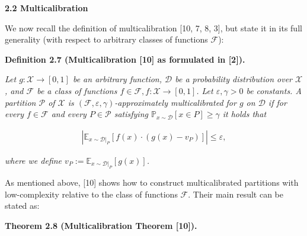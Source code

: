 \par\medskip\noindent\textbf{
2.2 Multicalibration}\par




We now recall the definition of multicalibration [10, 7, 8, 3], but state it in its full generality (with respect to arbitrary classes of functions $\mathcal{F}$):\par





\par\medskip\noindent\textbf{
\textbf{Definition 2.7}\textbf{ }(Multicalibration [10] as formulated in [2])\textbf{.}
}\par



\emph{Let $g:\mathcal{X}\rightarrow[0,1]$ be an arbitrary function, $\mathcal{D}$ be a probability distribution over $\mathcal{X}$, and $\mathcal{F}$ be a class of functions $f\in\mathcal{F},f:\mathcal{X}\rightarrow[0,1]$. Let $\varepsilon,\gamma>0$ be constants. A partition $\mathcal{P}$ of $\mathcal{X}$ is $(\mathcal{F},\varepsilon,\gamma)$-approximately multicalibrated for $g$ on $\mathcal{D}$ if for every $f\in\mathcal{F}$ and every $P\in\mathcal{P}$ satisfying $\mathbb{P}_{x\sim\mathcal{D}}[x\in P]\geq\gamma$ it holds that}\par


\[\begin{gathered}
\left|\mathbb{E}_{x\sim\mathcal{D}|_{P}}[f(x)\cdot(g(x)-v_{P})]\right|\leq\varepsilon,
\end{gathered}\]


\emph{where we define $v_{P}:=\mathbb{E}_{x\sim\mathcal{D}|_{P}}[g(x)]$.}\par






As mentioned above, [10] shows how to construct multicalibrated partitions with low-complexity relative to the class of functions $\mathcal{F}$. Their main result can be stated as:\par





\par\medskip\noindent\textbf{
\textbf{Theorem 2.8}\textbf{ }(Multicalibration Theorem [10])\textbf{.}
}\par



